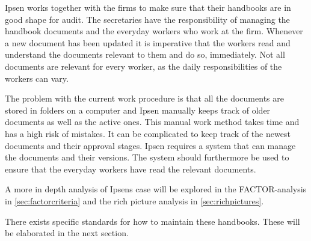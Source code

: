 Ipsen works together with the firms to make sure that their handbooks are in good shape for audit.
The secretaries have the responsibility of managing the handbook documents and the everyday workers who work at the firm.
Whenever a new document has been updated it is imperative that the workers read and understand the documents relevant to them and do so, immediately.
Not all documents are relevant for every worker, as the daily responsibilities of the workers can vary.

The problem with the current work procedure is that all the documents are stored in folders on a computer and Ipsen manually keeps track of older documents as well as the active ones.
This manual work method takes time and has a high risk of mistakes.
It can be complicated to keep track of the newest documents and their approval stages.
Ipsen requires a system that can manage the documents and their versions.
The system should furthermore be used to ensure that the everyday workers have read the relevant documents.

A more in depth analysis of Ipsens case will be explored in the FACTOR-analysis in \cref{sec:factorcriteria} and the rich picture analysis in \cref{sec:richpictures}.

There exists specific standards for how to maintain these handbooks.
These will be elaborated in the next section.

